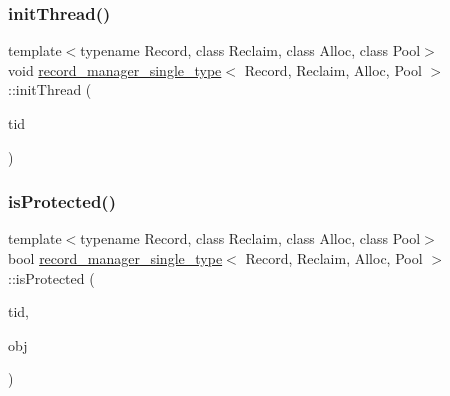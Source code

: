 \subsubsection{\texorpdfstring{init\+Thread()}{initThread()}}
{\footnotesize\ttfamily template$<$typename Record, class Reclaim, class Alloc, class Pool$>$ \\
void \hyperlink{classrecord__manager__single__type}{record\+\_\+manager\+\_\+single\+\_\+type}$<$ Record, Reclaim, Alloc, Pool $>$\+::init\+Thread (\begin{DoxyParamCaption}\item[{const int}]{tid }\end{DoxyParamCaption})\hspace{0.3cm}{\ttfamily [inline]}}

\mbox{\label{classrecord__manager__single__type_a468c13eaacc74f5c4f5db14ccffe433f}} 
\subsubsection{\texorpdfstring{is\+Protected()}{isProtected()}}
{\footnotesize\ttfamily template$<$typename Record, class Reclaim, class Alloc, class Pool$>$ \\
bool \hyperlink{classrecord__manager__single__type}{record\+\_\+manager\+\_\+single\+\_\+type}$<$ Record, Reclaim, Alloc, Pool $>$\+::is\+Protected (\begin{DoxyParamCaption}\item[{const int}]{tid,  }\item[{\hyperlink{classrecord__manager__single__type_a065f05d1a84e619758122b3da04b1327}{record\+\_\+pointer}}]{obj }\end{DoxyParamCaption})\hspace{0.3cm}{\ttfamily [inline]}}

\mbox{\label{classrecord__manager__single__type_a1da4897ec2820c5c6ad380e7b60e2a44}} 
